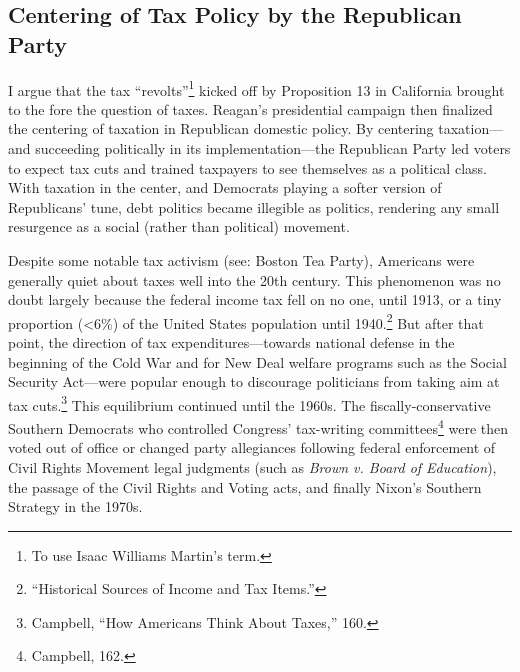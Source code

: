 \documentclass[
]{article}
\let\rmarkdownfootnote\footnote%
\def\footnote{\protect\rmarkdownfootnote}
\begin{document}
\hypertarget{centering-of-tax-policy-by-the-republican-party}{%
\subsection{Centering of Tax Policy by the Republican
Party}\label{centering-of-tax-policy-by-the-republican-party}}

I argue that the tax ``revolts''\footnote{To use Isaac Williams Martin's
  term.} kicked off by Proposition 13 in California brought to the fore
the question of taxes. Reagan's presidential campaign then finalized the
centering of taxation in Republican domestic policy. By centering
taxation---and succeeding politically in its implementation---the
Republican Party led voters to expect tax cuts and trained taxpayers to
see themselves as a political class. With taxation in the center, and
Democrats playing a softer version of Republicans' tune, debt politics
became illegible as politics, rendering any small resurgence as a social
(rather than political) movement.

Despite some notable tax activism (see: Boston Tea Party), Americans
were generally quiet about taxes well into the 20th century. This
phenomenon was no doubt largely because the federal income tax fell on
no one, until 1913, or a tiny proportion (\textless6\%) of the United
States population until 1940.\footnote{``Historical Sources of Income
  and Tax Items.''} But after that point, the direction of tax
expenditures---towards national defense in the beginning of the Cold War
and for New Deal welfare programs such as the Social Security Act---were
popular enough to discourage politicians from taking aim at tax
cuts.\footnote{Campbell, ``How Americans Think About Taxes,'' 160.} This
equilibrium continued until the 1960s. The fiscally-conservative
Southern Democrats who controlled Congress' tax-writing
committees\footnote{Campbell, 162.} were then voted out of office or
changed party allegiances following federal enforcement of Civil Rights
Movement legal judgments (such as \emph{Brown v. Board of Education}),
the passage of the Civil Rights and Voting acts, and finally Nixon's
Southern Strategy in the 1970s.
\end{document}
